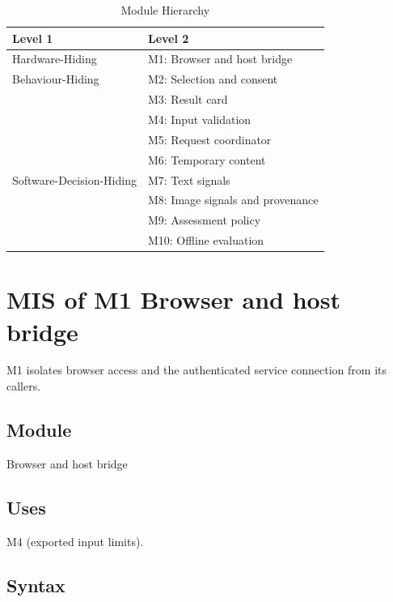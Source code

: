 \documentclass[12pt, titlepage]{article}
\begin{document}
\begin{table}[ht]
\centering
\begin{tabular}{p{} p{}}
\toprule
\textbf{Level 1} & \textbf{Level 2}\\
\midrule

Hardware-Hiding & M1: Browser and host bridge \\
\midrule

Behaviour-Hiding & M2: Selection and consent\\
& M3: Result card\\
& M4: Input validation\\
& M5: Request coordinator\\
& M6: Temporary content\\
\midrule

Software-Decision-Hiding & M7: Text signals\\
& M8: Image signals and provenance\\
& M9: Assessment policy\\
& M10: Offline evaluation\\
\bottomrule

\end{tabular}
\caption{Module Hierarchy}
\label{TblMH}
\end{table}

\clearpage

\section{MIS of M1 Browser and host bridge} \label{sec:m1}

M1 isolates browser access and the authenticated service connection from its callers.

\subsection{Module}

Browser and host bridge

\subsection{Uses}

M4 (exported input limits).

\subsection{Syntax}
\end{document}
